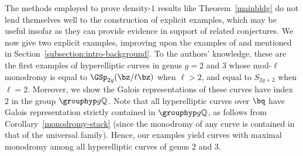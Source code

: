 The methods employed to prove density-$1$ results like Theorem~\ref{mainbldg} do not lend themselves well to the construction of explicit examples, which may be useful insofar as they can provide evidence in support of related conjectures. 
We now give two explicit examples, improving upon the examples of \cite{dooleyfat} and \cite{anni2016residual} mentioned in Section~\ref{subsection:intro-background}.
To the authors' knowledge,
these are the first examples of hyperelliptic curves in genus $g = 2$ and $3$
whose mod-$\ell$ monodromy is equal to 
$\GSp_{2g}(\bz/\ell\bz)$ when $\ell > 2$,
and equal to $S_{2g+2}$ when $\ell = 2$.
Moreover, we show the Galois representations of
these curves have index $2$ in the group
$\grouphyp g {\mathbb Q}$. Note that all hyperelliptic
curves over $\bq$ have Galois representation
strictly contained in $\grouphyp g {\mathbb Q}$,
as follows from
Corollary~\ref{monodromy-stack} (since the monodromy of any curve
is contained in that of the universal family).
Hence, our examples yield curves with
maximal monodromy among all hyperelliptic curves
of genus $2$ and $3$.


